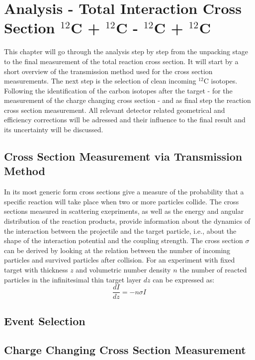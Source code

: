 \section{Analysis - Total Interaction Cross Section $^{12}$C + $^{12}$C - $^{12}$C + $^{12}$C}
This chapter will go through the  analysis step by step from the unpacking stage to the final measurement of the total reaction cross section. It will start by a short overview of the transmission method used for the cross section measurements. The next step is  the selection of clean incoming $^{12}$C isotopes. Following the identification of the carbon isotopes after the target - for the measurement of the charge changing cross section - and as final step the reaction cross section measurement. \newline
All relevant detector related geometrical and efficiency corrections will be adressed and their influence to the final result and its uncertainty will be discussed.
\subsection{Cross Section Measurement via Transmission Method}
In its most generic form cross sections give a measure of the probability that a specific reaction will take place when two or more particles collide. The cross sections  measured in scattering exepriments, as well as the energy and angular distribution of the reaction products, provide information about the dynamics of the interaction between the projectile and the target particle, i.e., about the shape of the interaction potential and the coupling strength.\newline
The cross section $\sigma$ can be derived by looking at the relation between the number of incoming particles and survived particles after collision. For an experiment with fixed target with thickness $z$ and volumetric number density $n$ the number of reacted particles in the infinitesimal thin target layer $dz$ can be expressed as:\newline
\begin{equation}
\frac{dI}{dz} = -n \sigma I
\end{equation}
\subsection{Event Selection}
\subsection{Charge Changing Cross Section Measurement}
